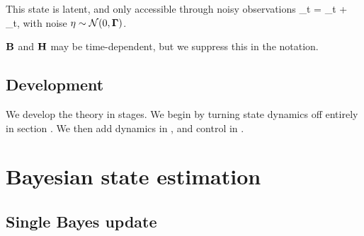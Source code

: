 \documentclass[notitlepage,openany,11pt]{report}
\numberwithin{equation}{section}
\theoremstyle{plain}%
\begin{document}
This state is latent, and only accessible through noisy observations
\be
{}_{t} =  _t + \mbf{\eta}_{t},
\ee
with noise $\eta \sim \mathcal{N}(0, \mathbf{\Gamma})$.

$\mathbf{B}$ and $\mathbf{H}$ may be time-dependent, but we suppress this in the notation.

\subsection{Development}

We develop the theory in stages. We begin by turning state dynamics off entirely in section . We then add dynamics in \boldref{}, and control in \boldref{}.


\section{Bayesian state estimation}
\label{sec-bayesian-state-estimation}

\subsection{Single Bayes update}
\end{document}
